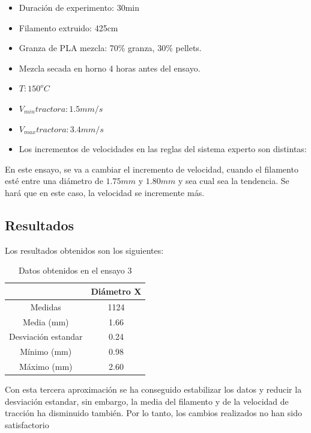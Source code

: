 \begin{itemize}
	\item{Duración de experimento: 30min}
	\item{Filamento extruido: 425cm}
	\item{Granza de PLA mezcla: 70\% granza, 30\% pellets.}
	\item{Mezcla secada en horno 4 horas antes del ensayo.}
	\item{$T: 150^oC$}
	\item{$V_{min} tractora: 1.5 mm/s$}
	\item{$V_{max} tractora: 3.4 mm/s$}
	\item{Los incrementos de velocidades en las reglas del sistema experto son distintas:}
\end{itemize}

En este ensayo, se va a cambiar el incremento de velocidad, cuando el filamento esté entre una diámetro de $1.75 mm$ y $1.80 mm$ y sea cual sea la tendencia. Se hará que en este caso, la velocidad se incremente más.

\subsection{Resultados}
Los resultados obtenidos son los siguientes:

\begin{table}[H]
	\centering
	\begin{tabular}{cc}
		                    & Diámetro X \\ \hline
		Medidas             & 1124      \\
		Media (mm)          & 1.66       \\
		Desviación estandar & 0.24       \\
		Mínimo (mm)         & 0.98       \\
		Máximo (mm)         & 2.60      
	\end{tabular}
	\caption{Datos obtenidos en el ensayo 3}
	\label{tab:resl_ens3}
\end{table}

Con esta tercera aproximación se ha conseguido estabilizar los datos y reducir la desviación estandar, sin embargo, la media del filamento y de la velocidad de tracción ha disminuido también. Por lo tanto, los cambios realizados no han sido satisfactorio

